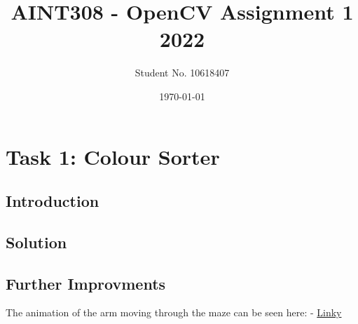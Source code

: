 \documentclass [11pt]{article}
\begin{document}
							
\title{\bf AINT308 - OpenCV Assignment 1 2022} 	
\author{Student No. 10618407} 								
\date{\today} 										
\maketitle 												
{}			
\newpage			
\setcounter{page}{2}								
\tableofcontents 
\newpage

\section{Task 1: Colour Sorter}	
\subsection{Introduction}
\subsection{Solution}
\subsection{Further Improvments}

The animation of the arm moving through the maze can be seen here: - \href{Link}{Linky}
\end{document}
